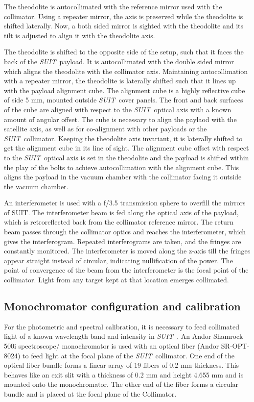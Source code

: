 \documentclass[12pt]{spieman}  %
\newcommand{\suit}{{\it SUIT~}}
\begin{document}
The theodolite is autocollimated with the reference mirror used with the collimator. Using a repeater mirror, the axis is preserved while the theodolite is shifted laterally. Now, a both sided mirror is sighted with the theodolite and its tilt is adjusted to align it with the theodolite axis.
	
The theodolite is shifted to the opposite side of the setup, such that it faces the back of the \suit payload. It is autocollimated with the double sided mirror which aligns the theodolite with the collimator axis. Maintaining autocollimation with a repeater mirror, the theodolite is laterally shifted such that it lines up with the payload alignment cube.
The alignment cube is a highly reflective cube of side 5 mm, mounted outside \suit cover panels. The front and back surfaces of the cube are aligned with respect to the \suit optical axis with a known amount of angular offset. The cube is necessary to align the paylaod with the satellite axis, as well as for co-alignment with other payloads or the \suit collimator.
Keeping the theodolite axis invariant, it is laterally shifted to get the alignment cube in its line of sight. The alignment cube offset with respect to the \suit optical axis is set in the theodolite and the payload is shifted within the play of the bolts to achieve autocollimation with the alignment cube. This aligns the payload in the vacuum chamber with the collimator facing it outside the vacuum chamber.
	
An interferometer is used with a f/3.5 transmission sphere to overfill the mirrors of SUIT. The interferometer beam is fed along the optical axis of the payload, which is retroreflected back from the collimator reference mirror. The return beam passes through the collimator optics and reaches the interferometer, which gives the  interferogram. Repeated interferograms are taken, and the fringes are constantly monitored. The interferometer is moved along the z-axis till the fringes appear straight instead of circular, indicating nullification of the power. The point of convergence of the beam from the interferometer is the focal point of the collimator. Light from any target kept at that location emerges collimated. 

\subsection{Monochromator configuration and calibration}
For the photometric and spectral calibration, it is necessary to feed collimated light of a known wavelength band and intensity in \suit.
An Andor Shamrock 500i spectroscope/ monochromator is used with an optical fiber (Andor SR-OPT-8024) to feed light at the focal plane of the \suit collimator. One end of the optical fiber bundle forms a linear array of 19 fibers of 0.2 mm thickness. This behaves like an exit slit with a thickness of 0.2 mm and height 4.655 mm and is mounted onto the monochromator. The other end of the fiber forms a circular bundle and is placed at the focal plane of the Collimator.
\end{document}

